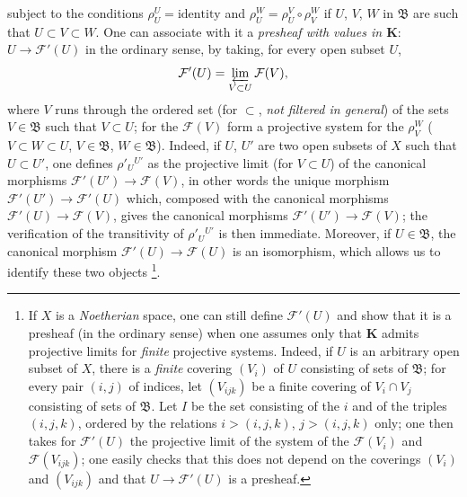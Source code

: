 \begin{env}[3.2.1]
subject to the conditions $\rho_U^U=\text{identity}$ and
$\rho_U^W=\rho_U^V\circ\rho_V^W$ if $U$, $V$, $W$ in $\mathfrak{B}$ are
such that $U\subset V\subset W$. One can associate with it a \emph{presheaf with
values in $\mathbf{K}$}: $U\to\mathcal{F}'(U)$ in the ordinary sense, by
taking, for every open subset $U$,
\[
  \mathcal{F}'(U)=\varprojlim_{V\subset U}\mathcal{F}(V),
\]
where $V$ runs through the ordered set (for $\subset$, \emph{not filtered in
general}) of the sets $V\in\mathfrak{B}$ such that $V\subset U$; for the
$\mathcal{F}(V)$ form a projective system for the $\rho_V^W$
($V\subset W\subset U$, $V\in\mathfrak{B}$, $W\in\mathfrak{B}$). Indeed,
if $U$, $U'$ are two open subsets of $X$ such that $U\subset U'$, one defines
$\rho'_U{}^{U'}$ as the projective limit (for $V\subset U$) of the canonical morphisms
$\mathcal{F}'(U')\to\mathcal{F}(V)$, in other words the unique
morphism $\mathcal{F}'(U')\to\mathcal{F}'(U)$ which, composed with the
canonical morphisms $\mathcal{F}'(U)\to\mathcal{F}(V)$, gives the canonical
morphisms $\mathcal{F}'(U')\to\mathcal{F}(V)$; the verification of the
transitivity of $\rho'_U{}^{U'}$ is then immediate. Moreover, if
$U\in\mathfrak{B}$, the canonical morphism
$\mathcal{F}'(U)\to\mathcal{F}(U)$ is an isomorphism, which allows us to identify
these two objects%
\footnote{If $X$ is a \emph{Noetherian} space, one can still define
$\mathcal{F}'(U)$ and show that it is a presheaf (in the ordinary sense)
when one assumes only that $\mathbf{K}$ admits projective limits
for \emph{finite} projective systems. Indeed, if $U$ is an arbitrary open subset
of $X$, there is a \emph{finite} covering $(V_i)$ of $U$ consisting
of sets of $\mathfrak{B}$; for every pair $(i,j)$ of indices, let
$(V_{ijk})$ be a finite covering of $V_i\cap V_j$ consisting of sets of
$\mathfrak{B}$. Let $I$ be the set consisting of the $i$ and of the triples $(i,j,k)$,
ordered by the relations $i>(i,j,k)$, $j>(i,j,k)$ only; one then takes
for $\mathcal{F}'(U)$ the projective limit of the system of the $\mathcal{F}(V_i)$
and $\mathcal{F}(V_{ijk})$; one easily checks that this does not depend on the
coverings $(V_i)$ and $(V_{ijk})$ and that $U\to\mathcal{F}'(U)$ is a
presheaf.}.
\end{env}

